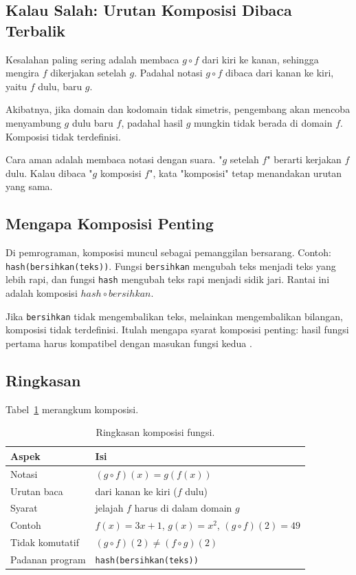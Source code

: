 \documentclass[11pt,a4paper]{article}
\begin{document}
\subsection{Kalau Salah: Urutan Komposisi Dibaca Terbalik}

Kesalahan paling sering adalah membaca $g \circ f$ dari kiri ke kanan, sehingga mengira $f$ dikerjakan setelah $g$. Padahal notasi $g \circ f$ dibaca dari kanan ke kiri, yaitu $f$ dulu, baru $g$.

Akibatnya, jika domain dan kodomain tidak simetris, pengembang akan mencoba menyambung $g$ dulu baru $f$, padahal hasil $g$ mungkin tidak berada di domain $f$. Komposisi tidak terdefinisi.

Cara aman adalah membaca notasi dengan suara. "$g$ setelah $f$" berarti kerjakan $f$ dulu. Kalau dibaca "$g$ komposisi $f$", kata "komposisi" tetap menandakan urutan yang sama.

\subsection{Mengapa Komposisi Penting}

Di pemrograman, komposisi muncul sebagai pemanggilan bersarang. Contoh: \texttt{hash(bersihkan(teks))}. Fungsi \texttt{bersihkan} mengubah teks menjadi teks yang lebih rapi, dan fungsi \texttt{hash} mengubah teks rapi menjadi sidik jari. Rantai ini adalah komposisi $hash \circ bersihkan$.

Jika \texttt{bersihkan} tidak mengembalikan teks, melainkan mengembalikan bilangan, komposisi tidak terdefinisi. Itulah mengapa syarat komposisi penting: hasil fungsi pertama harus kompatibel dengan masukan fungsi kedua \cite{kleppmann}.

\subsection{Ringkasan}

Tabel~\ref{tab:komposisi-fungsi} merangkum komposisi.

\begin{table}[H]
	\centering
	\caption{Ringkasan komposisi fungsi.}
	\label{tab:komposisi-fungsi}
	\small
	\begin{tabularx}{\textwidth}{l X}
		\toprule
		Aspek           & Isi                                          \\
		\midrule
		Notasi          & $(g \circ f)(x)=g(f(x))$                     \\
		Urutan baca     & dari kanan ke kiri ($f$ dulu)                \\
		Syarat          & jelajah $f$ harus di dalam domain $g$        \\
		Contoh          & $f(x)=3x+1$, $g(x)=x^2$, $(g \circ f)(2)=49$ \\
		Tidak komutatif & $(g \circ f)(2) \ne (f \circ g)(2)$          \\
		Padanan program & \texttt{hash(bersihkan(teks))}               \\
		\bottomrule
	\end{tabularx}
\end{table}
\end{document}

